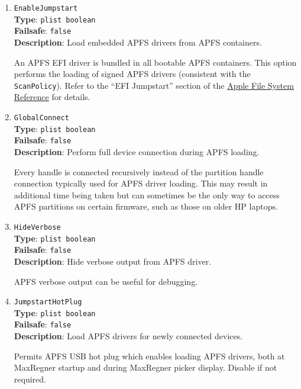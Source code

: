 \documentclass[]{article}
\begin{document}
\begin{enumerate}

\item
  \texttt{EnableJumpstart}\\
  \textbf{Type}: \texttt{plist\ boolean}\\
  \textbf{Failsafe}: \texttt{false}\\
  \textbf{Description}: Load embedded APFS drivers from APFS containers.

  An APFS EFI driver is bundled in all bootable APFS containers. This
  option performs the loading of signed APFS drivers (consistent with the
  \texttt{ScanPolicy}). Refer to the ``EFI Jumpstart'' section of the
  \href{https://developer.apple.com/support/apple-file-system/Apple-File-System-Reference.pdf}{Apple File System Reference} for details.


\item
  \texttt{GlobalConnect}\\
  \textbf{Type}: \texttt{plist\ boolean}\\
  \textbf{Failsafe}: \texttt{false}\\
  \textbf{Description}: Perform full device connection during APFS loading.

  Every handle is connected recursively instead of the partition handle connection
  typically used for APFS driver loading. This may result in additional time being
  taken but can sometimes be the only way to access APFS partitions on certain
  firmware, such as those on older HP laptops.

\item
  \texttt{HideVerbose}\\
  \textbf{Type}: \texttt{plist\ boolean}\\
  \textbf{Failsafe}: \texttt{false}\\
  \textbf{Description}: Hide verbose output from APFS driver.

  APFS verbose output can be useful for debugging.

\item
  \texttt{JumpstartHotPlug}\\
  \textbf{Type}: \texttt{plist\ boolean}\\
  \textbf{Failsafe}: \texttt{false}\\
  \textbf{Description}: Load APFS drivers for newly connected devices.

  Permits APFS USB hot plug which enables loading APFS drivers, both at MaxRegner
  startup and during MaxRegner picker display. Disable if not required.


\end{enumerate}
\end{document}
